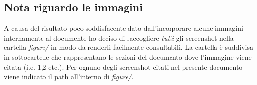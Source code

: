 \subsection{Nota riguardo le immagini}
A causa del risultato poco soddisfacente dato dall'incorporare alcune immagini internamente al documento ho deciso di raccogliere \textit{tutti} gli screenshot nella cartella \textit{figure/} in modo da renderli facilmente consultabili. La cartella
è suddivisa in sottocartelle che rappresentano le sezioni del documento dove 
l'immagine viene citata (i.e. 1,2 etc.). 
Per ognuno degli screenshot citati nel presente documento viene indicato il path all'interno di \textit{figure/}.